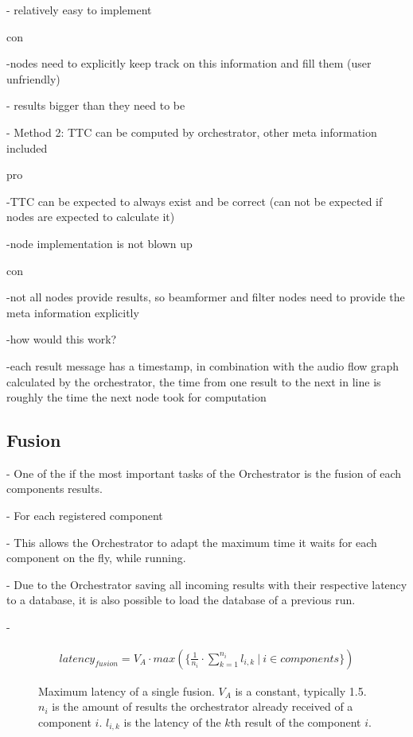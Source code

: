 - relatively easy to implement

con

-nodes need to explicitly keep track on this information and fill them (user unfriendly)

- results bigger than they need to be

- Method 2: TTC can be computed by orchestrator, other meta information included 

pro

-TTC can be expected to always exist and be correct (can not be expected if nodes are expected to calculate it)

-node implementation is not blown up

con

-not all nodes provide results, so beamformer and filter nodes need to provide the meta information explicitly

-how would this work?

-each result message has a timestamp, in combination with the audio flow graph calculated by the orchestrator, the time from one result to the next in line is roughly the time the next node took for computation


\subsection{Fusion}
- One of the if the most important tasks of the Orchestrator is the fusion of each components results.

- For each registered component

- This allows the Orchestrator to adapt the maximum time it waits for each component on the fly, while running.

- Due to the Orchestrator saving all incoming results with their respective latency to a database, it is also possible to load the database of a previous run.

- 


\begin{figure}
	\begin{align}
	latency_{fusion} = V_A \cdot max(\{\frac{1}{n_i} \cdot \sum_{k=1}^{n_i} l_{i,k}\ | \ i \in components\})
	\end{align}
	\caption{Maximum latency of a single fusion.
		$V_A$ is a constant, typically 1.5.
		$n_i$ is the amount of results the orchestrator already received of a component $i$.
		$l_{i,k}$ is the latency of the $k$th result of the component $i$.}
	\label{main:orc:latency:formula}
\end{figure}